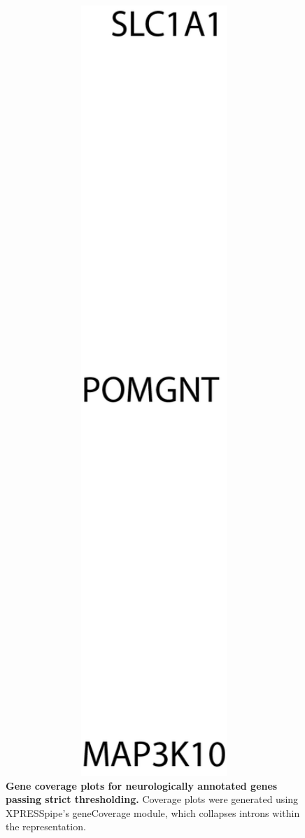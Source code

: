 \documentclass[10pt, oneside]{article}
\begin{document}
\begin{figure}
\centering
  \includegraphics[width=180mm]{figures/xpresspipe_supplement4.png}
  \caption{\textbf{Gene coverage plots for neurologically annotated genes passing strict thresholding.} Coverage plots were generated using XPRESSpipe's geneCoverage module, which collapses introns within the representation.}
  \label{fig:supplement4}
\end{figure}
\end{document}
